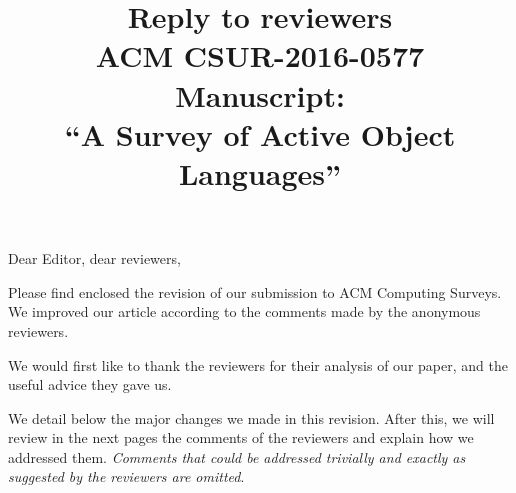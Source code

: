 \documentclass{article}
\title{Reply to reviewers\\
ACM CSUR-2016-0577 Manuscript: \\``A Survey of Active Object Languages'' }
\begin{document}
\maketitle
\noindent
Dear Editor, dear reviewers,

Please find enclosed the revision of our submission to ACM Computing
Surveys. We improved our article according to the comments made by the
anonymous reviewers.

We would first like to thank the reviewers for their analysis of our
paper, and the useful advice they gave us.

We detail below the major changes we made in this revision. After
this, we will review in the next pages the comments of the reviewers
and explain how we addressed them.  \emph{Comments that could be
  addressed trivially and exactly as suggested by the reviewers are
  omitted}.  \bigskip
\end{document}
